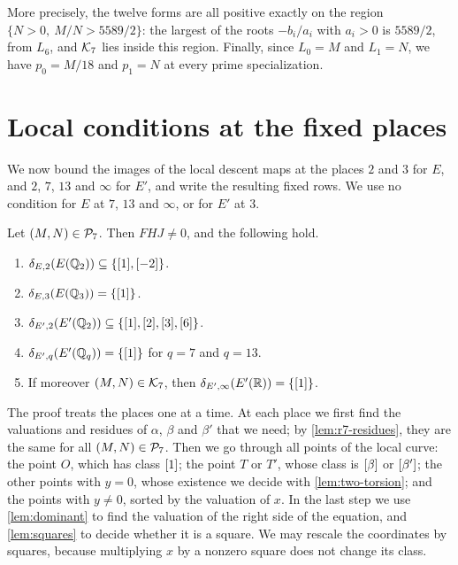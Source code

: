 More precisely, the twelve forms are all positive exactly on the region
$\{N>0,\ M/N>5589/2\}$: the largest of the roots $-b_i/a_i$ with $a_i>0$ is
$5589/2$, from $L_6$, and $\mathcal K_7$ lies inside this region. Finally, since
$L_0=M$ and $L_1=N$, we have $p_0=M/18$ and $p_1=N$ at every prime
specialization.

\section{Local conditions at the fixed places}\label{sec:r7-fixed}

We now bound the images of the local descent maps at the places $2$ and $3$ for $E$, and $2$, $7$, $13$ and $\infty$ for $E'$, and write the resulting fixed rows. We use no condition for $E$ at $7$, $13$ and
$\infty$, or for $E'$ at $3$.

\begin{lemma}\label{lem:r7-fixed}
Let $(M,N)\in\mathcal P_7$. Then $FHJ\ne0$, and the following hold.
\begin{enumerate}[label=(\alph*)]
\item\label{item:r7-E2} $\delta_{E,2}(E(\mathbb Q_2))\subseteq\{[1],[-2]\}$.
\item\label{item:r7-E3} $\delta_{E,3}(E(\mathbb Q_3))=\{[1]\}$.
\item\label{item:r7-Ep2} $\delta_{E',2}(E'(\mathbb Q_2))\subseteq\{[1],[2],[3],[6]\}$.
\item\label{item:r7-Ep713} $\delta_{E',q}(E'(\mathbb Q_q))=\{[1]\}$ for $q=7$ and $q=13$.
\item\label{item:r7-Epinf} If moreover $(M,N)\in\mathcal K_7$, then
$\delta_{E',\infty}(E'(\mathbb R))=\{[1]\}$.
\end{enumerate}
\end{lemma}

The proof treats the places one at a time. At each place we first find the
valuations and residues of $\alpha$, $\beta$ and $\beta'$ that we need; by
\cref{lem:r7-residues}, they are the same for all $(M,N)\in\mathcal P_7$. Then we
go through all points of the local curve: the point $O$, which has class
$[1]$; the point $T$ or $T'$, whose class is $[\beta]$ or $[\beta']$;
the other points with $y=0$, whose existence we decide with
\cref{lem:two-torsion}; and the points with $y\ne0$, sorted by the
valuation of $x$. In the last step we use \cref{lem:dominant} to find the
valuation of the right side of the equation, and \cref{lem:squares} to
decide whether it is a square. We may rescale the coordinates by squares,
because multiplying $x$ by a nonzero square does not change its class.

